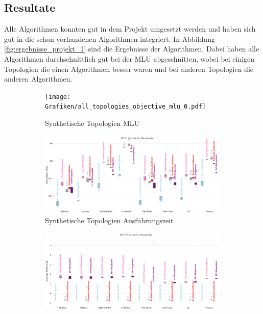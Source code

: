 \documentclass[sigconf,nonacm,review,language=english,language=german]{acmart}
\begin{document}
    \subsection{Resultate}
        Alle Algorithmen konnten gut in dem Projekt umgesetzt werden und haben sich gut in die schon vorhandenen Algorithmen integriert. In Abbildung \ref{fig:ergebnisse_projekt_1} sind die Ergebnisse der Algorithmen. Dabei haben alle Algorithmen durchschnittlich gut bei der MLU abgeschnitten, wobei bei einigen Topologien die einen Algorithmen besser waren und bei anderen Topologien die anderen Algorithmen. 

        \begin{figure}[h]
           \centering
            \begin{subfigure}{0.49\textwidth}
                \centering
               \texttt{[image: Grafiken/all\_topologies\_objective\_mlu\_0.pdf]}
               \caption{Synthetische Topologien MLU}
               \label{fig:ergebnisse_projekt_1_synt_topo_mlu}
            \end{subfigure}
            \begin{subfigure}{0.49\textwidth}
                \centering
               \includegraphics[width=1\linewidth]{Grafiken/projekt1/all_topologies_execution_time_0.pdf}
               \caption{Synthetische Topologien Ausführungszeit}
               \label{fig:ergebnisse_projekt_1_synt_topo_time}
            \end{subfigure}
           \begin{subfigure}{0.49\textwidth}
                \centering
               \includegraphics[width=1\linewidth]{Grafiken/projekt1/all_topologies_objective_apl_0.pdf}

\end{subfigure}
\end{figure}
\end{document}
